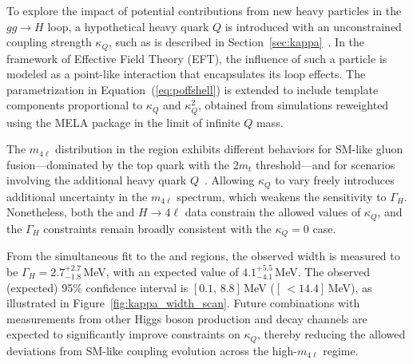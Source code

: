 To explore the impact of potential contributions from new heavy particles in the $gg \to H$ loop, a hypothetical heavy quark $Q$ is introduced with an unconstrained coupling strength $\kappa_Q$, such as is described in Section~\ref{sec:kappa}~\cite{Gritsan:2020pib,Davis:2021tiv}. In the framework of Effective Field Theory (EFT), the influence of such a particle is modeled as a point-like interaction that encapsulates its loop effects. The parametrization in Equation~(\ref{eq:poffshell}) is extended to include template components proportional to $\kappa_Q$ and $\kappa_Q^2$, obtained from simulations reweighted using the MELA package in the limit of infinite $Q$ mass. 

The $m_{4\ell}$ distribution in the \offshell region exhibits different behaviors for SM-like gluon fusion—dominated by the top quark with the $2m_t$ threshold—and for scenarios involving the additional heavy quark $Q$~\cite{Gritsan:2020pib}. Allowing $\kappa_Q$ to vary freely introduces additional uncertainty in the $m_{4\ell}$ spectrum, which weakens the sensitivity to $\Gamma_H$. Nonetheless, both the \onshell and \offshell $H \to 4\ell$ data constrain the allowed values of $\kappa_Q$, and the $\Gamma_H$ constraints remain broadly consistent with the $\kappa_Q = 0$ case.

From the simultaneous fit to the \onshell and \offshell regions, the observed width is measured to be $\Gamma_H = 2.7^{+2.7}_{-1.8}$\,MeV, with an expected value of $4.1^{+5.5}_{-4.1}$\,MeV. The observed (expected) 95\% confidence interval is $[0.1,\,8.8]$\,MeV ($[\,{<}14.4]$\,MeV), as illustrated in Figure~\ref{fig:kappa_width_scan}. Future combinations with measurements from other \onshell Higgs boson production and decay channels are expected to significantly improve constraints on $\kappa_Q$, thereby reducing the allowed deviations from SM-like coupling evolution across the high-$m_{4\ell}$ regime.

